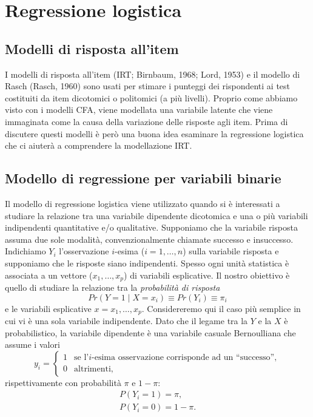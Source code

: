 \chapter{Regressione logistica}
\label{chapter:logistic_regression} 

\section{Modelli di risposta all'item}

I modelli di risposta all'item (IRT; Birnbaum, 1968; Lord, 1953) e il modello di Rasch (Rasch, 1960) sono usati per stimare i punteggi dei rispondenti ai test  costituiti da item dicotomici o politomici (a più livelli). Proprio come abbiamo visto con i modelli CFA, viene modellata una variabile latente che viene immaginata come la causa della variazione delle risposte agli item. 
Prima di discutere questi modelli è però una buona idea esaminare la regressione logistica che ci aiuterà a comprendere la modellazione IRT.

\section{Modello di regressione per variabili binarie}

Il modello di regressione logistica viene utilizzato quando si è interessati a studiare la relazione tra una variabile dipendente dicotomica e una o più variabili indipendenti quantitative e/o qualitative. Supponiamo che la variabile risposta assuma due sole modalità, convenzionalmente chiamate successo e insuccesso. Indichiamo $Y_i$ l'osservazione $i$-esima ($i=1, \dots, n$) sulla variabile risposta e supponiamo che le risposte siano indipendenti. Spesso ogni unità statistica è associata a un vettore ($x_1, \dots, x_p$) di variabili esplicative. Il nostro obiettivo è quello di studiare la relazione tra la \emph{probabilit\`a di risposta}
\[
Pr(Y=1 \mid X=x_i) \equiv Pr(Y_i) \equiv \pi_i
\]
e le variabili esplicative $x=x_1, \dots, x_p$. Considereremo qui il caso più semplice in cui vi è una sola variabile indipendente. Dato che il legame tra la $Y$ e la $X$ è probabilistico, la variabile dipendente è una variabile casuale Bernoulliana che assume i valori
  \begin{displaymath}
    y_i = \left\{ \begin{array}{ll}
        1 & \textrm{se l'$i$-esima osservazione corrisponde ad un ``successo''},\\
        0 & \textrm{altrimenti},
      \end{array} \right.
  \end{displaymath}
  rispettivamente con probabilit\`a $\pi$ e $1-\pi$:
  \begin{displaymath}
    \begin{array}{ll}
      P(Y_i = 1) = \pi,\\
      P(Y_i = 0) = 1-\pi.
    \end{array}
  \end{displaymath}

